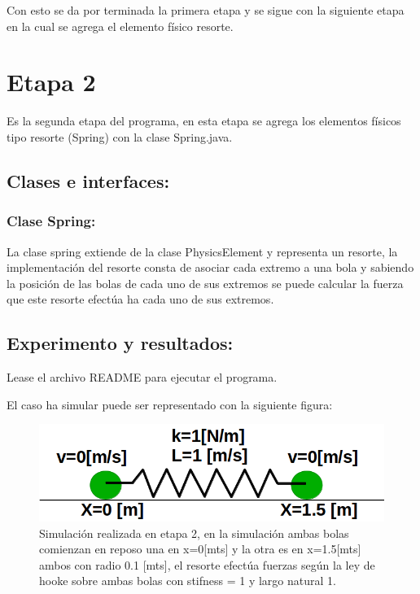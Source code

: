 \documentclass[a4paper,10pt]{article}
\begin{document}
Con esto se da por terminada la primera etapa y se sigue con la siguiente etapa en la cual se agrega el elemento físico resorte.\newline

\section{Etapa 2}

Es la segunda etapa del programa, en esta etapa se agrega los elementos físicos tipo resorte (Spring) con la clase Spring.java.

\subsection{Clases e interfaces:}

\subsubsection{Clase Spring:}

La clase spring extiende de la clase PhysicsElement y representa un resorte, la implementación del resorte consta de asociar cada extremo a 
una bola y sabiendo la posición de las bolas de cada uno de sus extremos se puede calcular la fuerza que este resorte efectúa ha cada
uno de sus extremos.\newline

\subsection{Experimento y resultados:}

Lease el archivo README para ejecutar el programa.\newline

El caso ha simular puede ser representado con la siguiente figura:

\begin{figure}[H]
 \centering
 \includegraphics[scale=0.3]{./FigureB.png}
 \caption{Simulación realizada en etapa 2, en la simulación ambas bolas comienzan en reposo una en x=0[mts] y la otra es en x=1.5[mts]
 ambos con radio 0.1 [mts], el resorte efectúa fuerzas según la ley de hooke sobre ambas bolas con stifness = 1 y largo natural 1.}
  \label{etapa2.1}
\end{figure}
\end{document}
